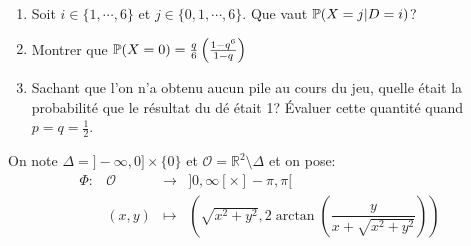 \documentclass[a4paper]{tp_um}
\begin{document}
\begin{enumerate}
    \item  Soit  $i\in \{ 1 ,\cdots, 6 \}$ et $j\in \{ 0,1 ,\cdots, 6 \}$.   Que  vaut $\P ( X = j | D = i)$?




    \item Montrer que $\P(X=0) = \frac q 6 \left( \frac{1-q^6}{1-q} \right) $





    \item Sachant que l'on n'a obtenu aucun pile au cours du jeu, quelle était la probabilité que le résultat du dé était 1?  Évaluer cette quantité quand $ p = q =\frac 1 2$.


\end{enumerate}

\bigskip


\exo{}
On note $\Delta = ]-\infty,0]\times \{0\}$ et $\mathcal O = \mathbb R^2 \setminus \Delta$
et on pose: 
\[
\begin{array}{rrcl}
\Phi : & \mathcal O  & \longrightarrow & ]0,\infty[ \times ]-\pi,\pi[  \\
		& (x,y) & \longmapsto & \left( \sqrt{x^2+y^2}, 2 \arctan\left( \dfrac{y}{x+ \sqrt{x^2+y^2}}\right) \right)
\end{array}
\]
\end{document}

